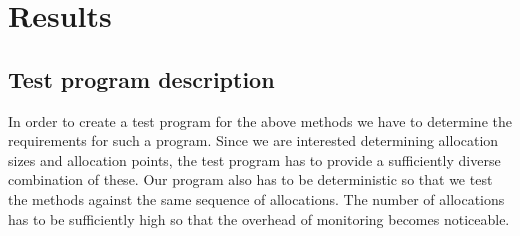 \chapter{Results}
\label{chapter:results}

\section{Test program description}
\label{section:testprogram}

In order to create a test program for the above methods we have to determine the requirements for such a program. Since we are interested determining allocation sizes and allocation points, the test program has to provide a sufficiently diverse combination of these. Our program also has to be deterministic so that we test the methods against the same sequence of allocations. The number of allocations has to be sufficiently high so that the overhead of monitoring becomes noticeable.
